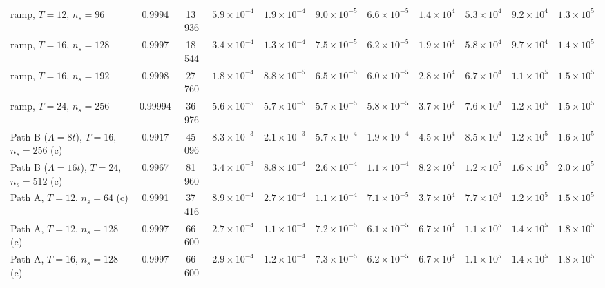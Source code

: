 \documentclass[a4paper,11pt,noarxiv]{quantumarticle}
\begin{document}
\begin{table}[t]
{\begin{tabular}{lcc|cccc|cccc}
  ramp, $T=12$, $n_s=96$ & 0.9994 & 13\,936 & $5.9{\times}10^{-4}$ & $1.9{\times}10^{-4}$ & $9.0{\times}10^{-5}$ & $6.6{\times}10^{-5}$ & $1.4{\times}10^{4}$ & $5.3{\times}10^{4}$ & $9.2{\times}10^{4}$ & $1.3{\times}10^{5}$\\
  ramp, $T=16$, $n_s=128$ & 0.9997 & 18\,544 & $3.4{\times}10^{-4}$ & $1.3{\times}10^{-4}$ & $7.5{\times}10^{-5}$ & $6.2{\times}10^{-5}$ & $1.9{\times}10^{4}$ & $5.8{\times}10^{4}$ & $9.7{\times}10^{4}$ & $1.4{\times}10^{5}$\\
  ramp, $T=16$, $n_s=192$ & 0.9998 & 27\,760 & $1.8{\times}10^{-4}$ & $8.8{\times}10^{-5}$ & $6.5{\times}10^{-5}$ & $6.0{\times}10^{-5}$ & $2.8{\times}10^{4}$ & $6.7{\times}10^{4}$ & $1.1{\times}10^{5}$ & $1.5{\times}10^{5}$\\
  ramp, $T=24$, $n_s=256$ & 0.99994 & 36\,976 & $5.6{\times}10^{-5}$ & $5.7{\times}10^{-5}$ & $5.7{\times}10^{-5}$ & $5.8{\times}10^{-5}$ & $3.7{\times}10^{4}$ & $7.6{\times}10^{4}$ & $1.2{\times}10^{5}$ & $1.5{\times}10^{5}$\\
  Path B ($\Lambda=8t$), $T=16$, $n_s=256$ (c) & 0.9917 & 45\,096 & $8.3{\times}10^{-3}$ & $2.1{\times}10^{-3}$ & $5.7{\times}10^{-4}$ & $1.9{\times}10^{-4}$ & $4.5{\times}10^{4}$ & $8.5{\times}10^{4}$ & $1.2{\times}10^{5}$ & $1.6{\times}10^{5}$\\
  Path B ($\Lambda=16t$), $T=24$, $n_s=512$ (c) & 0.9967 & 81\,960 & $3.4{\times}10^{-3}$ & $8.8{\times}10^{-4}$ & $2.6{\times}10^{-4}$ & $1.1{\times}10^{-4}$ & $8.2{\times}10^{4}$ & $1.2{\times}10^{5}$ & $1.6{\times}10^{5}$ & $2.0{\times}10^{5}$\\
  Path A, $T=12$, $n_s=64$ (c) & 0.9991 & 37\,416 & $8.9{\times}10^{-4}$ & $2.7{\times}10^{-4}$ & $1.1{\times}10^{-4}$ & $7.1{\times}10^{-5}$ & $3.7{\times}10^{4}$ & $7.7{\times}10^{4}$ & $1.2{\times}10^{5}$ & $1.5{\times}10^{5}$\\
  Path A, $T=12$, $n_s=128$ (c) & 0.9997 & 66\,600 & $2.7{\times}10^{-4}$ & $1.1{\times}10^{-4}$ & $7.2{\times}10^{-5}$ & $6.1{\times}10^{-5}$ & $6.7{\times}10^{4}$ & $1.1{\times}10^{5}$ & $1.4{\times}10^{5}$ & $1.8{\times}10^{5}$\\
  Path A, $T=16$, $n_s=128$ (c) & 0.9997 & 66\,600 & $2.9{\times}10^{-4}$ & $1.2{\times}10^{-4}$ & $7.3{\times}10^{-5}$ & $6.2{\times}10^{-5}$ & $6.7{\times}10^{4}$ & $1.1{\times}10^{5}$ & $1.4{\times}10^{5}$ & $1.8{\times}10^{5}$\\
  \bottomrule
  \end{tabular}}
\end{table}
\end{document}
